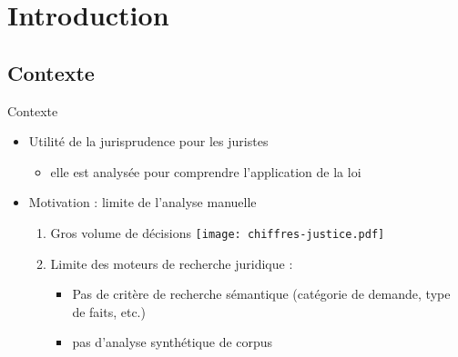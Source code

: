 \section{Introduction}

\subsection{Contexte}
\begin{frame}[c]{Contexte}
	\begin{itemize}
		\item Utilité de la jurisprudence pour les juristes
		\begin{itemize}
			\item elle est analysée pour comprendre l'application de la loi
		\end{itemize}
	    \item Motivation : limite de l'analyse manuelle
	    \begin{enumerate}
	    	\item Gros volume de décisions 
	    		\texttt{[image: chiffres-justice.pdf]}   	
			\item Limite des moteurs de recherche juridique : 
			\begin{itemize}
				\item Pas de critère de recherche sémantique (catégorie de demande, type de faits, etc.)
				\item pas d'analyse synthétique de corpus
			\end{itemize}
	    \end{enumerate}
	\end{itemize}
\end{frame}

%
%	
%	
%	

